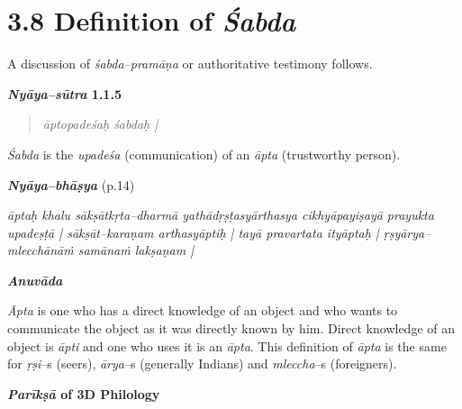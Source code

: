 \vspace{-.3cm}

\section*{3.8 Definition of {\it {\bfseries Śabda}}}

A discussion of \textit{śabda–pramāṇa }or authoritative testimony follows.

\textbf{\textit{Nyāya–sūtra} 1.1.5}

\vspace{-.3cm}

\begin{verse}
\textit{āptopadeśaḥ śabdaḥ |}
\end{verse}

\vspace{-.3cm}

\textit{Śabda} is the \textit{upadeśa} (communication) of an \textit{āpta} (trustworthy person).

\textit{\textbf{Nyāya–bhāṣya}} (p.14)

\begin{myquote}
\textit{āptaḥ khalu sākṣātkṛta–dharmā yathādṛṣṭasyārthasya cikhyāpayiṣayā prayukta upadeṣṭā | sākṣāt–karaṇam arthasyāptiḥ | tayā pravartata ityāptaḥ | ṛṣyārya–mlecchānāṁ samānaṁ lakṣaṇam |}
\end{myquote}

\textit{\textbf{Anuvāda}}

\textit{Āpta} is one who has a direct knowledge of an object and who wants to communicate the object as it was directly known by him. Direct knowledge of an object is \textit{āpti} and one who uses it is an \textit{āpta}. This definition of \textit{āpta} is the same for \textit{ṛṣi}–s (seers), \textit{ārya}–s (generally Indians) and \textit{mleccha}–s (foreigners).

\textbf{\textit{Parīkṣā} of 3D Philology}

